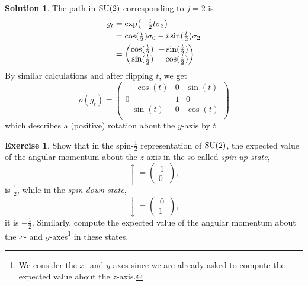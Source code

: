 \documentclass[11pt, a4paper]{report}
\theoremstyle{definition}
\newtheorem{exercise}{Exercise}[part]
\newtheorem{solution}{Solution}[part]
\newenvironment{ex}{\begin{exercise}}{\end{exercise}\pagebreak[1]}
\newenvironment{sol}{\begin{solution}}{\end{solution}\pagebreak[3]}
\newcommand*{\m}{\ensuremath\:\, \mathllap{-}}
\newcommand*{\SU}{\ensuremath\text{SU}}
\begin{document}
\begin{sol}
The path in $\SU(2)$ corresponding to $j = 2$ is
\begin{align*}
    g_t &= \exp\bigl(-\tfrac{i}{2} t \sigma_2\bigr) \\
        &= \cos(\tfrac{t}{2}) \sigma_0 - i\sin(\tfrac{t}{2}) \sigma_2 \\
        &= \begin{pmatrix*}[r]
                \cos(\tfrac{t}{2}) & \m \sin(\tfrac{t}{2}) \\
                \sin(\tfrac{t}{2}) & \cos(\tfrac{t}{2})
            \end{pmatrix*}.
\end{align*}
By similar calculations and after flipping $t$, we get
\[
    \rho(g_t) = \begin{pmatrix}
            \phantom{-} \cos(t) & 0 & \sin(t) \\
            0 \!\!\!            & 1 & 0 \,\, \\
            - \sin(t)           & 0 & \cos(t) \\
        \end{pmatrix}
\]
which describes a (positive) rotation about the $y$-axis by $t$.

\end{sol}

\begin{ex}

Show that in the spin-$\tfrac{1}{2}$ representation of $\SU(2)$, the expected value of the angular momentum about the $z$-axis in the so-called \emph{spin-up state},
\[
    {\uparrow} = \begin{pmatrix}
            \,1\, \\ 0
        \end{pmatrix},
\]
is $\tfrac{1}{2}$, while in the \emph{spin-down state},
\[
    {\downarrow} = \begin{pmatrix}
            \,0\, \\ 1
        \end{pmatrix},
\]
it is $-\tfrac{1}{2}$.
Similarly, compute the expected value of the angular momentum about the $x$- and $y$-axes\footnote{We consider the $x$- and $y$-axes since we are already asked to compute the expected value about the $z$-axis.} in these states.

\end{ex}
\end{document}
